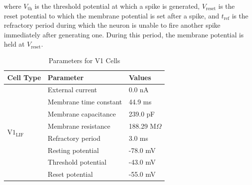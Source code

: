 \documentclass[12pt]{article}
\begin{document}
where \(V_{\text{th}}\) is the threshold potential at which a spike is generated, \(V_{\text{reset}}\) is the reset potential to which the membrane potential is set after a spike, and \(t_{\text{ref}}\) is the refractory period during which the neuron is unable to fire another spike immediately after generating one. During this period, the membrane potential is held at \(V_{\text{reset}}\).

\begin{table}[H]
  \centering
  \caption{Parameters for V1 Cells}
  \begin{tabular}{lll}
  \toprule
  \textbf{Cell Type} & \textbf{Parameter} & \textbf{Values} \\
  \midrule
  \multirow{8}{*}{$\text{V1}_{\text{LIF}}$} 
      & External current         & 0.0 nA \\
      & Membrane time constant        & 44.9 ms \\
      & Membrane capacitance          & 239.0 pF \\
      & Membrane resistance           & 188.29 M$\Omega$ \\  %
      & Refractory period       & 3.0 ms \\
      & Resting potential          & -78.0 mV \\
      & Threshold potential         & -43.0 mV \\
      & Reset potential      & -55.0 mV \\
  \bottomrule
  \end{tabular}
\end{table}


\end{document}
